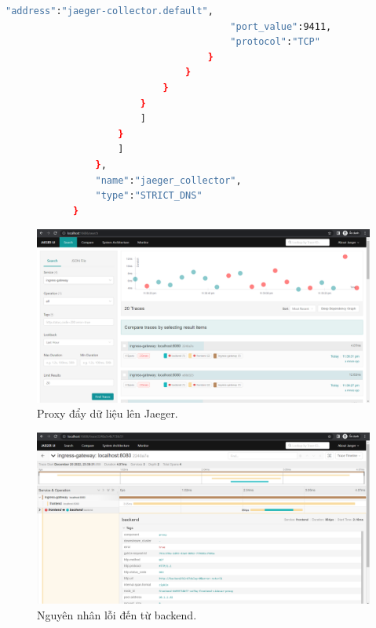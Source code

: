\documentclass[14pt,a4paper]{report}
\begin{document}
{\begin{lstlisting}[language=Bash]
										"address":"jaeger-collector.default",
										"port_value":9411,
										"protocol":"TCP"
									}
								}
							}
						}
						]
					}
					]
				},
				"name":"jaeger_collector",
				"type":"STRICT_DNS"
			}
	\end{lstlisting}
	\hspace{1.0cm}{Sau khi apply lại, thì chúng ta sẽ lên giao diện của Jaeger và kiểm tra: \\}
	\begin{figure}[h]
		\centering
		\includegraphics[width=1\linewidth]{Pics/jaeger-ingress-gateway}
		\caption{\label{fig:jaeger-ingress-gateway} Proxy đẩy dữ liệu lên Jaeger.}
		\label{fig:jaeger-ingress-gateway}
	\end{figure}
	\hspace{0.3cm}{Để điều tra, chúng ta sẽ ấn vào từng truy vấn cụ thể, và qua đấy, chúng ta sẽ biết được rằng nguyên nhân nào gây ra lỗi của ứng dụng.\\}
	\pagebreak
	\begin{figure}[h]
		\centering
		\includegraphics[width=1\linewidth]{Pics/jaeger-error}
		\caption{\label{fig:jaeger-error} Nguyên nhân lỗi đến từ backend.}
		\label{fig:jaeger-error}
	\end{figure}
}
\end{document}
